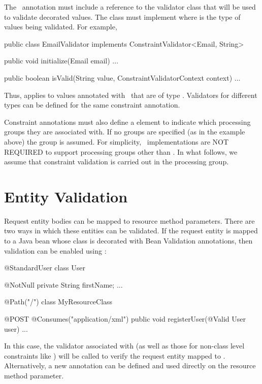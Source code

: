 The \Constraint\ annotation must include a reference to the validator class that will be used to validate decorated values. The  class must implement  where  is the type of values being validated. For example, 

\begin{listing}{1}
public class EmailValidator implements ConstraintValidator<Email, String> {
  public void initialize(Email email) { 
    ...
  }

  public boolean isValid(String value, ConstraintValidatorContext context) {
   ...
  }
}
\end{listing}

Thus,  applies to values annotated with \Email\ that are of type . Validators for different types can be defined for the same constraint annotation. 

Constraint annotations must also define a  element to indicate which processing groups they are associated with. If no groups are specified (as in the example above) the  group is assumed. For simplicity, \jaxrs\ implementations are NOT REQUIRED to support processing groups other than . In what follows, we assume that constraint validation is carried out in the  processing group.

\section{Entity Validation}
\label{entity_validation}

Request entity bodies can be mapped to resource method parameters. There are two ways in which these entities can be validated. If the request entity is mapped to a Java bean whose class is decorated with Bean Validation annotations, then validation can be enabled using \Valid:

\begin{listing}{1}
@StandardUser
class User {

  @NotNull
  private String firstName;  
  ...
}

@Path("/")
class MyResourceClass {

  @POST
  @Consumes("application/xml")
  public void registerUser(@Valid User user) {
    ...
  }
}
\end{listing}

In this case, the validator associated with  (as well as those for non-class level constraints like ) will be called to verify the request entity mapped to . Alternatively, a new annotation can be defined and used directly on the resource method parameter. 

